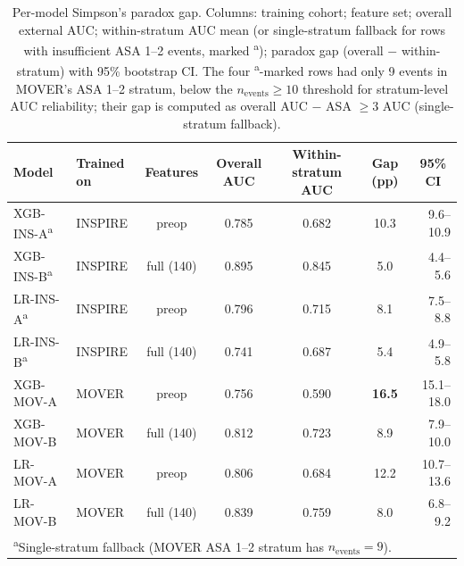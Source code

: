 \begin{table}[htbp]
\centering
\caption{Per-model Simpson's paradox gap. Columns: training cohort;
feature set; overall external AUC; within-stratum AUC mean (or
single-stratum fallback for rows with insufficient ASA 1--2 events,
marked \textsuperscript{a}); paradox gap (overall $-$ within-stratum) with
95\% bootstrap CI. The four \textsuperscript{a}-marked rows had only 9
events in MOVER's ASA 1--2 stratum, below the $n_{\text{events}} \ge 10$
threshold for stratum-level AUC reliability; their gap is computed as
overall AUC $-$ ASA $\geq 3$ AUC (single-stratum fallback).}
\label{tab:paradox}
\setlength{\tabcolsep}{3.5pt}
\small
\begin{tabular}{llcccc r@{}}
\toprule
\textbf{Model} & \textbf{Trained on} & \textbf{Features} & \textbf{Overall AUC} & \textbf{Within-stratum AUC} & \textbf{Gap (pp)} & \multicolumn{1}{c}{\textbf{95\% CI}} \\
\midrule
XGB-INS-A\textsuperscript{a} & INSPIRE & preop      & 0.785 & 0.682 & 10.3 & 9.6--10.9 \\
XGB-INS-B\textsuperscript{a} & INSPIRE & full (140) & 0.895 & 0.845 &  5.0 & 4.4--5.6 \\
LR-INS-A\textsuperscript{a}  & INSPIRE & preop      & 0.796 & 0.715 &  8.1 & 7.5--8.8 \\
LR-INS-B\textsuperscript{a}  & INSPIRE & full (140) & 0.741 & 0.687 &  5.4 & 4.9--5.8 \\
\midrule
XGB-MOV-A & MOVER   & preop      & 0.756 & 0.590 & \textbf{16.5} & 15.1--18.0 \\
XGB-MOV-B & MOVER   & full (140) & 0.812 & 0.723 &  8.9 & 7.9--10.0 \\
LR-MOV-A  & MOVER   & preop      & 0.806 & 0.684 & 12.2 & 10.7--13.6 \\
LR-MOV-B  & MOVER   & full (140) & 0.839 & 0.759 &  8.0 & 6.8--9.2 \\
\bottomrule
\multicolumn{7}{l}{\footnotesize \textsuperscript{a}Single-stratum fallback (MOVER ASA 1--2 stratum has $n_{\text{events}} = 9$).} \\
\end{tabular}
\end{table}

